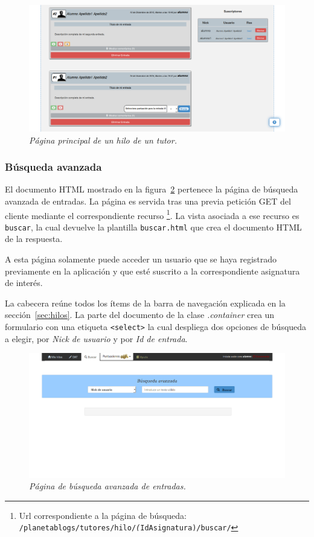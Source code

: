 \documentclass[a4paper, 12pt]{book}
\begin{document}
\begin{figure}
  \centering
  \includegraphics[width=17cm, keepaspectratio]{imagenes/HiloTutorEntradas}
  \caption{\textit{P\'agina principal de un hilo de un tutor.}}
  \label{fig:hilotutor}
\end{figure}


\subsubsection{B\'usqueda avanzada} 
\label{sec:buscar}
El documento HTML mostrado en la figura~\ref{fig:buscar} pertenece la p\'agina de b\'usqueda avanzada de entradas. 
La p\'agina es servida tras una previa petici\'on GET del cliente mediante el correspondiente recurso \footnote{Url correspondiente a la p\'agina de 
b\'usqueda: \texttt{/planetablogs/tutores/hilo/\textit(IdAsignatura)/buscar/}}. La vista asociada a ese recurso es \texttt{buscar}, la cual 
devuelve la plantilla \texttt{buscar.html} que crea el documento HTML de la respuesta.

A esta p\'agina solamente puede acceder un usuario que se haya registrado previamente en la aplicaci\'on y que est\'e suscrito a la correspondiente 
asignatura de inter\'es.

La cabecera re\'une todos los \'items de la barra de navegaci\'on explicada en la secci\'on~\ref{sec:hilos}. La parte del documento de la clase 
\textit{.container} crea un formulario con una etiqueta \texttt{<select>} la cual despliega dos opciones de b\'usqueda a elegir, por \textit{Nick de usuario} 
y por \textit{Id de entrada}.
\begin{figure}
  \centering
  \includegraphics[width=17cm, keepaspectratio]{imagenes/HiloAlumnoBuscar}
  \caption{\textit{P\'agina de b\'usqueda avanzada de entradas.}}
  \label{fig:buscar}
\end{figure}
\end{document}
